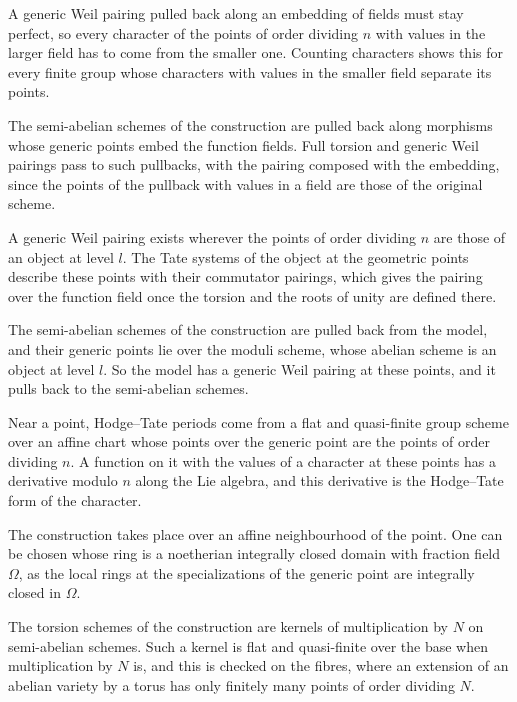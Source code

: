 A generic Weil pairing pulled back along an embedding of fields must stay perfect, so every character of the points of
order dividing $n$ with values in the larger field has to come from the smaller one. Counting characters shows this for
every finite group whose characters with values in the smaller field separate its points.

The semi-abelian schemes of the construction are pulled back along morphisms whose generic points embed the function
fields. Full torsion and generic Weil pairings pass to such pullbacks, with the pairing composed with the embedding, since
the points of the pullback with values in a field are those of the original scheme.

A generic Weil pairing exists wherever the points of order dividing $n$ are those of an object at level $l$. The Tate
systems of the object at the geometric points describe these points with their commutator pairings, which gives the
pairing over the function field once the torsion and the roots of unity are defined there.

The semi-abelian schemes of the construction are pulled back from the model, and their generic points lie over the
moduli scheme, whose abelian scheme is an object at level $l$. So the model has a generic Weil pairing at these points,
and it pulls back to the semi-abelian schemes.

Near a point, Hodge--Tate periods come from a flat and quasi-finite group scheme over an affine chart whose points over
the generic point are the points of order dividing $n$. A function on it with the values of a character at these points
has a derivative modulo $n$ along the Lie algebra, and this derivative is the Hodge--Tate form of the character.

The construction takes place over an affine neighbourhood of the point. One can be chosen whose ring is a noetherian
integrally closed domain with fraction field $\Omega$, as the local rings at the specializations of the generic point are
integrally closed in $\Omega$.

The torsion schemes of the construction are kernels of multiplication by $N$ on semi-abelian schemes. Such a kernel is flat
and quasi-finite over the base when multiplication by $N$ is, and this is checked on the fibres, where an extension of an
abelian variety by a torus has only finitely many points of order dividing $N$.

